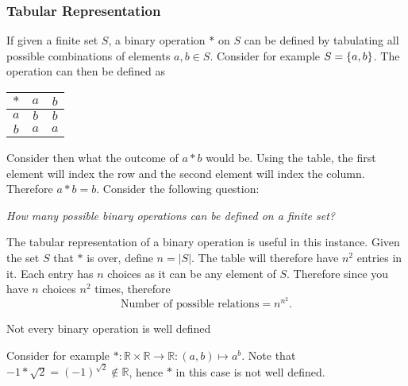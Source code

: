 \documentclass[../notes.tex]{subfiles}
\begin{document}
\subsubsection{Tabular Representation}
If given a finite set $S$, a binary operation $*$ on $S$ can be defined by tabulating all possible combinations of elements $a,b \in S$. Consider for example $S = \qty{a,b}$. The operation can then be defined as
\begin{center}
	\begin{tabular}{c | c | c}
		$*$ & $a$ & $b$ \\\hline
		$a$ & $b$ & $b$ \\\hline
		$b$ & $a$ & $a$ 
	\end{tabular}
\end{center}
Consider then what the outcome of $a * b$ would be. Using the table, the first element will index the row and the second element will index the column. Therefore $a * b = b$. Consider the following question:
\begin{center}
	\textit{How many possible binary operations can be defined on a finite set?}
\end{center}

The tabular representation of a binary operation is useful in this instance. Given the set $S$ that $*$ is over, define $n = |S|$. The table will therefore have $n^2$ entries in it. Each entry has $n$ choices as it can be any element of $S$. Therefore since you have $n$ choices $n^2$ times, therefore 
\[
	\text{Number of possible relations} = n^{n^2}
.\]

\begin{remark}
	Not every binary operation is well defined
\end{remark}

Consider for example $* : \mathbb{R} \times \mathbb{R} \to \mathbb{R} : (a,b) \mapsto a^b$. Note that $-1 * \sqrt{2} = (-1)^{\sqrt{2}} \notin \mathbb{R}$, hence $*$ in this case is not well defined.
\end{document}
